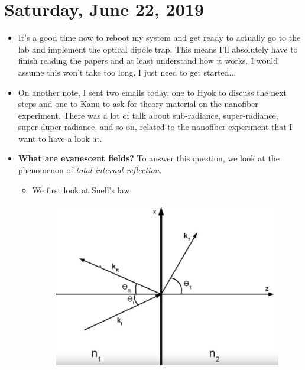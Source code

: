 \documentclass{book}
\theoremstyle{definition}
\begin{document}
\section*{Saturday, June 22, 2019}
\begin{itemize}
	\item It's a good time now to reboot my system and get ready to actually go to the lab and implement the optical dipole trap. This means I'll absolutely have to finish reading the papers and at least understand how it works. I would assume this won't take too long. I just need to get started...
	
	\item On another note, I sent two emails today, one to Hyok to discuss the next steps and one to Kanu to ask for theory material on the nanofiber experiment. There was a lot of talk about sub-radiance, super-radiance, super-duper-radiance, and so on, related to the nanofiber experiment that I want to have a look at. 
	
	\item \textbf{What are evanescent fields?} To answer this question, we look at the phenomenon of \textit{total internal reflection}. 
	
	\begin{itemize}
		\item We first look at Snell's law:
		\begin{figure}[!htb]
			\centering
			\includegraphics[scale=0.3]{snells-law}
		\end{figure}
	

\end{itemize}
\end{itemize}
\end{document}
